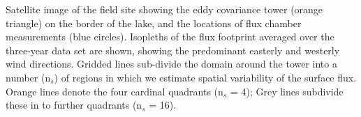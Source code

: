 \label{fig:fp_on_map_Stordalen} Satellite image of the field
site showing the eddy covariance tower (orange triangle) on the border
of the lake, and the locations of flux chamber measurements (blue
circles). Isopleths of the flux footprint averaged over the three-year
data set are shown, showing the predominant easterly and westerly wind
directions. Gridded lines sub-divide the domain around the tower into a
number (n\(_s\)) of regions in which we estimate spatial variability of
the surface flux. Orange lines denote the four cardinal quadrants
(n\(_s\) = 4); Grey lines subdivide these in to further quadrants
(n\(_s\) = 16).
